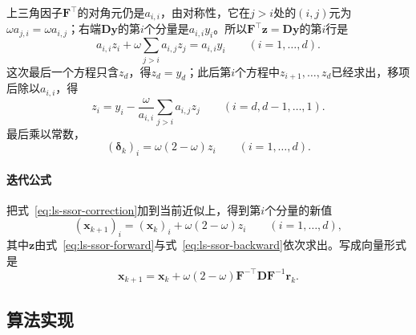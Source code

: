 上三角因子$\bm F^\top$的对角元仍是$a_{i,i}$，由对称性，它在$j>i$处的$(i,j)$元为$\omega a_{j,i}=\omega a_{i,j}$；右端$\bm D\bm y$的第$i$个分量是$a_{i,i}y_i$。所以$\bm F^\top\bm z=\bm D\bm y$的第$i$行是
\[
 a_{i,i}z_i+\omega\sum_{j>i}a_{i,j}z_j=a_{i,i}y_i\qquad(i=1,\ldots,d).
\]
这次最后一个方程只含$z_d$，得$z_d=y_d$；此后第$i$个方程中$z_{i+1},\ldots,z_d$已经求出，移项后除以$a_{i,i}$，得
\begin{equation}
 z_i=y_i-\frac{\omega}{a_{i,i}}\sum_{j>i}a_{i,j}z_j\qquad(i=d,d-1,\ldots,1).
 \label{eq:ls-ssor-backward}
\end{equation}
最后乘以常数，
\begin{equation}
 (\bm\delta_k)_i=\omega(2-\omega)z_i\qquad(i=1,\ldots,d).
 \label{eq:ls-ssor-correction}
\end{equation}

\paragraph{迭代公式}
把式~\eqref{eq:ls-ssor-correction}加到当前近似上，得到第$i$个分量的新值
\begin{equation}
 (\bm x_{k+1})_i=(\bm x_k)_i+\omega(2-\omega)z_i\qquad(i=1,\ldots,d),
 \label{eq:ls-ssor-update}
\end{equation}
其中$\bm z$由式~\eqref{eq:ls-ssor-forward}与式~\eqref{eq:ls-ssor-backward}依次求出。写成向量形式是
\[
 \bm x_{k+1}=\bm x_k+\omega(2-\omega)\bm F^{-\top}\bm D\bm F^{-1}\bm r_k .
\]

\subsection{算法实现}

